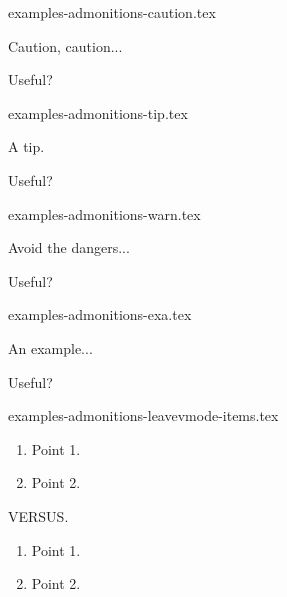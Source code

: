 \begin{filecontents*}[overwrite]{examples-admonitions-caution.tex}
\begin{tdoccaut}
    Caution, caution...
\end{tdoccaut}

\begin{tdoccaut}
    Useful?
\end{tdoccaut}
\end{filecontents*}


\begin{filecontents*}[overwrite]{examples-admonitions-tip.tex}
\begin{tdoctip}
    A tip.
\end{tdoctip}

\begin{tdoctip}
    Useful?
\end{tdoctip}
\end{filecontents*}


\begin{filecontents*}[overwrite]{examples-admonitions-warn.tex}
\begin{tdocwarn}
    Avoid the dangers...
\end{tdocwarn}

\begin{tdocwarn}
    Useful?
\end{tdocwarn}
\end{filecontents*}


\begin{filecontents*}[overwrite]{examples-admonitions-exa.tex}
\begin{tdocexa}
    An example...
\end{tdocexa}

\begin{tdocexa}
    Useful?
\end{tdocexa}
\end{filecontents*}


\begin{filecontents*}[overwrite]{examples-admonitions-leavevmode-items.tex}
\begin{tdoctip}
    \begin{enumerate}
        \item Point 1.
        \item Point 2.
    \end{enumerate}
\end{tdoctip}
VERSUS.
\begin{tdoctip}
    \begin{enumerate}[wide]
        \item Point 1.
        \item Point 2.
    \end{enumerate}
\end{tdoctip}
\end{filecontents*}


